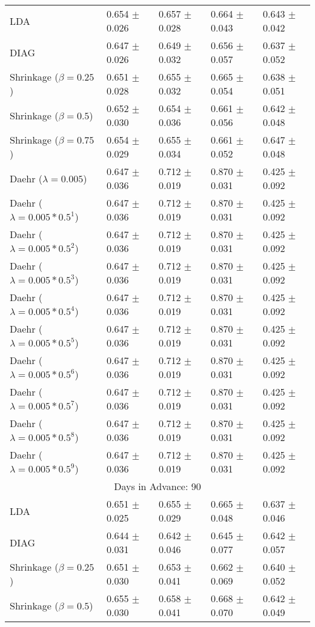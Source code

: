 \begin{table}
\begin{tabular}{*{5}{l}}
LDA&0.654 $\pm$ 0.026&0.657 $\pm$ 0.028&0.664 $\pm$ 0.043&0.643 $\pm$ 0.042\\
DIAG&0.647 $\pm$ 0.026&0.649 $\pm$ 0.032&0.656 $\pm$ 0.057&0.637 $\pm$ 0.052\\
Shrinkage ($\beta=0.25$)&0.651 $\pm$ 0.028&0.655 $\pm$ 0.032&0.665 $\pm$ 0.054&0.638 $\pm$ 0.051\\
Shrinkage ($\beta=0.5$)&0.652 $\pm$ 0.030&0.654 $\pm$ 0.036&0.661 $\pm$ 0.056&0.642 $\pm$ 0.048\\
Shrinkage ($\beta=0.75$)&0.654 $\pm$ 0.029&0.655 $\pm$ 0.034&0.661 $\pm$ 0.052&0.647 $\pm$ 0.048\\
Daehr ($\lambda=0.005$)&0.647 $\pm$ 0.036&0.712 $\pm$ 0.019&0.870 $\pm$ 0.031&0.425 $\pm$ 0.092\\
Daehr ($\lambda=0.005*0.5^1$)&0.647 $\pm$ 0.036&0.712 $\pm$ 0.019&0.870 $\pm$ 0.031&0.425 $\pm$ 0.092\\
Daehr ($\lambda=0.005*0.5^2$)&0.647 $\pm$ 0.036&0.712 $\pm$ 0.019&0.870 $\pm$ 0.031&0.425 $\pm$ 0.092\\
Daehr ($\lambda=0.005*0.5^3$)&0.647 $\pm$ 0.036&0.712 $\pm$ 0.019&0.870 $\pm$ 0.031&0.425 $\pm$ 0.092\\
Daehr ($\lambda=0.005*0.5^4$)&0.647 $\pm$ 0.036&0.712 $\pm$ 0.019&0.870 $\pm$ 0.031&0.425 $\pm$ 0.092\\
Daehr ($\lambda=0.005*0.5^5$)&0.647 $\pm$ 0.036&0.712 $\pm$ 0.019&0.870 $\pm$ 0.031&0.425 $\pm$ 0.092\\
Daehr ($\lambda=0.005*0.5^6$)&0.647 $\pm$ 0.036&0.712 $\pm$ 0.019&0.870 $\pm$ 0.031&0.425 $\pm$ 0.092\\
Daehr ($\lambda=0.005*0.5^7$)&0.647 $\pm$ 0.036&0.712 $\pm$ 0.019&0.870 $\pm$ 0.031&0.425 $\pm$ 0.092\\
Daehr ($\lambda=0.005*0.5^8$)&0.647 $\pm$ 0.036&0.712 $\pm$ 0.019&0.870 $\pm$ 0.031&0.425 $\pm$ 0.092\\
Daehr ($\lambda=0.005*0.5^9$)&0.647 $\pm$ 0.036&0.712 $\pm$ 0.019&0.870 $\pm$ 0.031&0.425 $\pm$ 0.092\\
\hline\multicolumn{5}{c}{  Days in Advance: 90}\\\hline
LDA&0.651 $\pm$ 0.025&0.655 $\pm$ 0.029&0.665 $\pm$ 0.048&0.637 $\pm$ 0.046\\
DIAG&0.644 $\pm$ 0.031&0.642 $\pm$ 0.046&0.645 $\pm$ 0.077&0.642 $\pm$ 0.057\\
Shrinkage ($\beta=0.25$)&0.651 $\pm$ 0.030&0.653 $\pm$ 0.041&0.662 $\pm$ 0.069&0.640 $\pm$ 0.052\\
Shrinkage ($\beta=0.5$)&0.655 $\pm$ 0.030&0.658 $\pm$ 0.041&0.668 $\pm$ 0.070&0.642 $\pm$ 0.049\\

\end{tabular}
\end{table}
